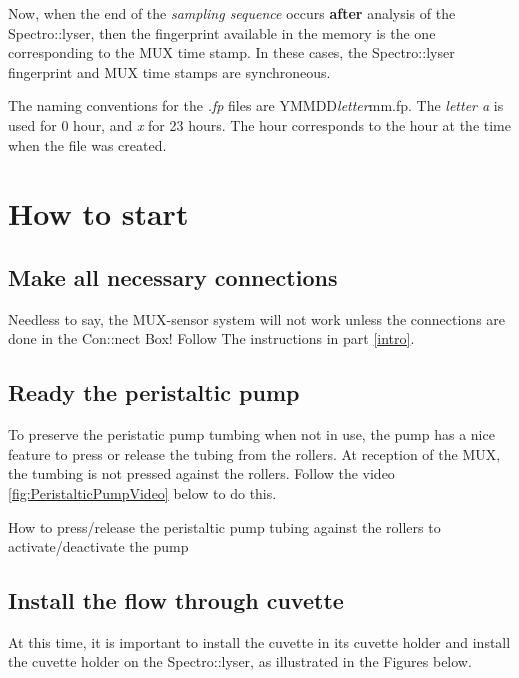 \documentclass[]{book}
\begin{document}
Now, when the end of the \emph{sampling sequence} occurs \textbf{after} analysis of the Spectro::lyser, then the fingerprint available in the memory is the one corresponding to the MUX time stamp. In these cases, the Spectro::lyser fingerprint and MUX time stamps are synchroneous.

The naming conventions for the \emph{.fp} files are YMMDD\emph{letter}mm.fp. The \emph{letter a} is used for 0 hour, and \emph{x} for 23 hours. The hour corresponds to the hour at the time when the file was created.

\hypertarget{how-to-start}{%
\chapter{How to start}\label{how-to-start}}

\hypertarget{make-all-necessary-connections}{%
\section{Make all necessary connections}\label{make-all-necessary-connections}}

Needless to say, the MUX-sensor system will not work unless the connections are done in the Con::nect Box! Follow The instructions in part \ref{intro}.

\hypertarget{ready-the-peristaltic-pump}{%
\section{Ready the peristaltic pump}\label{ready-the-peristaltic-pump}}

To preserve the peristatic pump tumbing when not in use, the pump has a nice feature to press or release the tubing from the rollers. At reception of the MUX, the tumbing is not pressed against the rollers. Follow the video \ref{fig:PeristalticPumpVideo} below to do this.

\label{fig:PeristalticPumpVideo}How to press/release the peristaltic pump tubing against the rollers to activate/deactivate the pump

\hypertarget{install-the-flow-through-cuvette}{%
\section{Install the flow through cuvette}\label{install-the-flow-through-cuvette}}

At this time, it is important to install the cuvette in its cuvette holder and install the cuvette holder on the Spectro::lyser, as illustrated in the Figures below.
\end{document}
